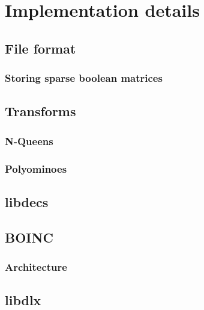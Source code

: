
\chapter{Implementation details}
\label{implementation}


\section{File format}

\subsection{Storing sparse boolean matrices}


\section{Transforms}

\subsection{N-Queens}

\subsection{Polyominoes}


\section{libdecs}


\section{BOINC}

\subsection{Architecture}


\section{libdlx}


